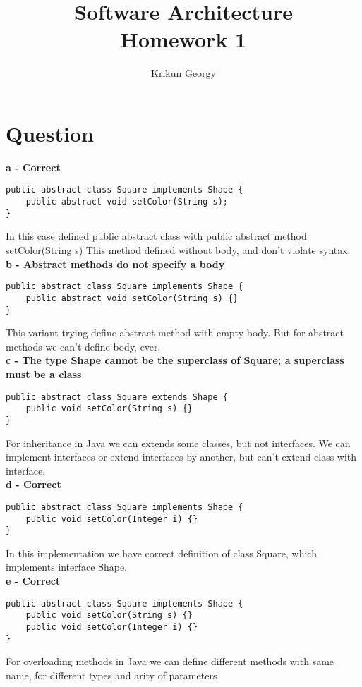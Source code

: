 \documentclass[a4paper,11pt]{article}
\author{Krikun Georgy}
\title{Software Architecture\\Homework 1}
\begin{document}
\maketitle
\newpage
\section{Question}
\textbf{a - Correct}
\begin{lstlisting}
public abstract class Square implements Shape {
	public abstract void setColor(String s);
}
\end{lstlisting}
In this case defined public abstract class with public abstract method setColor(String s)
This method defined without body, and don't violate syntax.\\

\textbf{b - Abstract methods do not specify a body}
\begin{lstlisting}
public abstract class Square implements Shape {
	public abstract void setColor(String s) {}
}
\end{lstlisting}
This variant trying define abstract method with empty body.
But for abstract methods we can't define body, ever.\\

\textbf{c - The type Shape cannot be the superclass of Square; a superclass must be a class}

\begin{lstlisting}
public abstract class Square extends Shape {
	public void setColor(String s) {}
}
\end{lstlisting}
For inheritance in Java we can extends some classes, but not interfaces.
We can implement interfaces or extend interfaces by another, but can't extend class with interface.\\

\textbf{d - Correct}

\begin{lstlisting}
public abstract class Square implements Shape {
	public void setColor(Integer i) {}
}
\end{lstlisting}
In this implementation we have correct definition of class Square, which implements interface Shape.\\

\textbf{e - Correct}

\begin{lstlisting}
public abstract class Square implements Shape {
	public void setColor(String s) {}
	public void setColor(Integer i) {}
}
\end{lstlisting}
For overloading methods in Java we can define different methods with same name, for different types and arity of parameters\\
\end{document}
